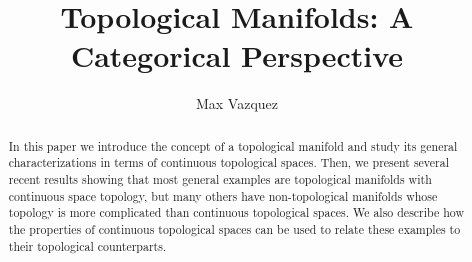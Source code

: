 \documentclass[a4paper,reqno,oneside]{article}
\begin{document}
\title{Topological Manifolds: A Categorical Perspective}
\author{Max Vazquez}
\maketitle


\begin{abstract}
    In this paper we introduce the concept of a topological manifold and study its general characterizations in terms of continuous topological spaces. Then, we present several recent results showing that most general examples are topological manifolds with continuous space topology, but many others have non-topological manifolds whose topology is more complicated than continuous topological spaces. We also describe how the properties of continuous topological spaces can be used to relate these examples to their topological counterparts. 
\end{abstract}
\end{document}
